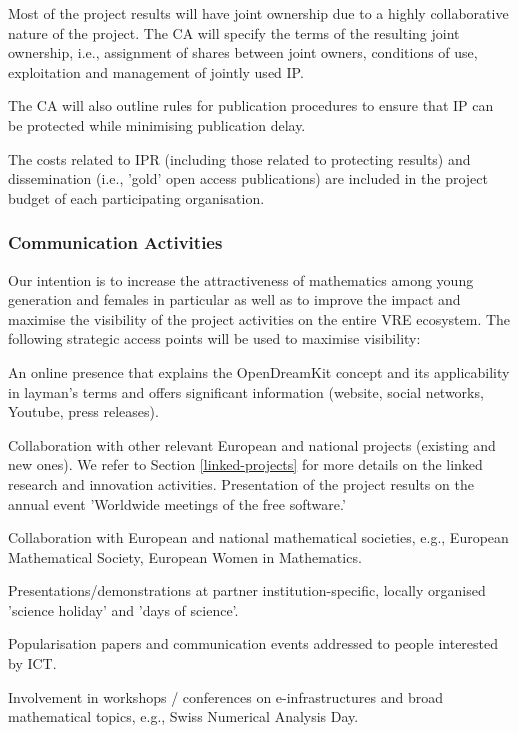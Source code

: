 Most of the project results will have joint ownership due to a highly collaborative nature of the project. The CA will specify the terms of the resulting joint ownership, i.e., assignment of shares between joint owners, conditions of use, exploitation and management of jointly used IP. 

The CA will also outline rules for publication procedures to ensure that IP can be protected while minimising publication delay.

The costs related to IPR (including those related to protecting results) and dissemination (i.e., 'gold' open access publications) are included in the project budget of each participating organisation. 

\subsubsection{Communication Activities}
\label{subsubsect:communication}


Our intention is to increase the attractiveness of mathematics among young generation and females in particular as well as to improve the impact and maximise the visibility of the project activities on the entire VRE ecosystem. The following strategic access points will be used to maximise visibility:

\begin{compactenum}
\item An online presence that explains the OpenDreamKit concept and its applicability in layman's terms and offers significant information (website, social networks, Youtube, press releases).
\item Collaboration with other relevant European and national projects (existing and new ones). We refer to Section \ref{linked-projects} for more details on the linked research and innovation activities.  Presentation of the project results on the annual event 'Worldwide meetings of the free software.' 
\item Collaboration with European and national mathematical societies, e.g., European Mathematical Society, European Women in Mathematics.
\item Presentations/demonstrations at partner institution-specific, locally organised 'science holiday' and 'days of science'.
\item Popularisation papers and communication events addressed to people interested by ICT. 
\item Involvement in workshops / conferences on e-infrastructures and broad mathematical topics, e.g., Swiss Numerical Analysis Day.
\end{compactenum}

